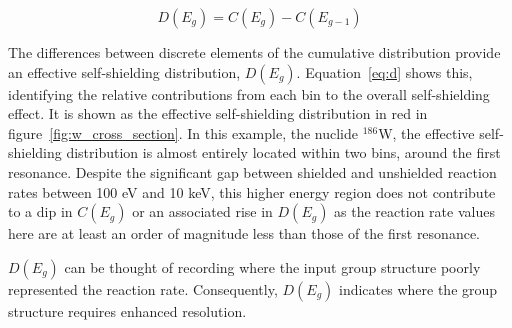 \begin{equation}
  \label{eq:d}
  D(E_{g}) = C(E_{g}) - C(E_{g-1})
\end{equation}

The differences between discrete elements of the cumulative distribution provide an effective self-shielding distribution, $D(E_{g})$. Equation~\ref{eq:d} shows this, identifying the relative contributions from each bin to the overall self-shielding effect. It is shown as the effective self-shielding distribution in red in figure~\ref{fig:w_cross_section}. In this example, the nuclide $^{186}$W, the effective self-shielding distribution is almost entirely located within two bins, around the first resonance. Despite the significant gap between shielded and unshielded reaction rates between 100 eV and 10 keV, this higher energy region does not contribute to a dip in $C(E_{g})$ or an associated rise in $D(E_{g})$ as the reaction rate values here are at least an order of magnitude less than those of the first resonance. 

$D(E_{g})$ can be thought of recording where the input group structure poorly represented the reaction rate. Consequently, $D(E_{g})$ indicates where the group structure requires enhanced resolution. 

